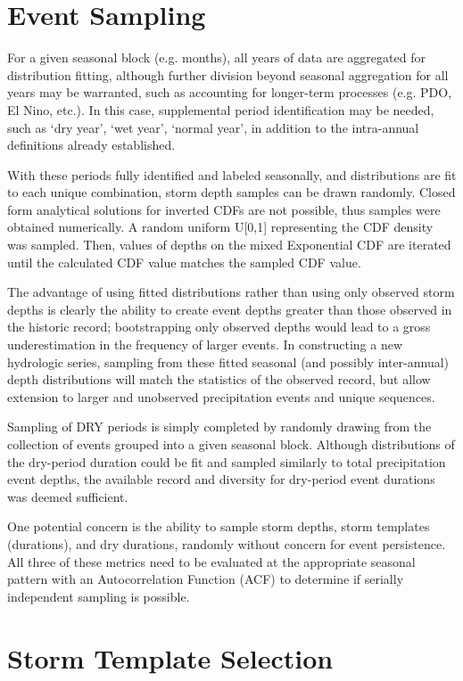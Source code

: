 \documentclass[11pt]{article} %
\begin{document}
\section{Event Sampling}

For a given seasonal block (e.g. months), all years of data are aggregated for distribution fitting, although further division beyond seasonal aggregation for all years may be warranted, such as accounting for longer-term processes (e.g. PDO, El Nino, etc.). In this case, supplemental period identification may be needed, such as ‘dry year’, ‘wet year’, ‘normal year’, in addition to the intra-annual definitions already established. 

With these periods fully identified and labeled seasonally, and distributions are fit to each unique combination, storm depth samples can be drawn randomly. Closed form analytical solutions for inverted CDFs are not possible, thus samples were obtained numerically. A random uniform U[0,1] representing the CDF density was sampled. Then, values of depths on the mixed Exponential CDF are iterated until the calculated CDF value matches the sampled CDF value.

The advantage of using fitted distributions rather than using only observed storm depths is clearly the ability to create event depths greater than those observed in the historic record; bootstrapping only observed depths would lead to a gross underestimation in the frequency of larger events. In constructing a new hydrologic series, sampling from these fitted seasonal (and possibly inter-annual) depth distributions will match the statistics of the observed record, but allow extension to larger and unobserved precipitation events and unique sequences.

Sampling of DRY periods is simply completed by randomly drawing from the collection of events grouped into a given seasonal block. Although distributions of the dry-period duration could be fit and sampled similarly to total precipitation event depths, the available record and diversity for dry-period event durations was deemed sufficient. 

One potential concern is the ability to sample storm depths, storm templates (durations), and dry durations, randomly without concern for event persistence. All three of these metrics need to be evaluated at the appropriate seasonal pattern with an Autocorrelation Function (ACF) to determine if serially independent sampling is possible. 

\section{Storm Template Selection}
\end{document}
